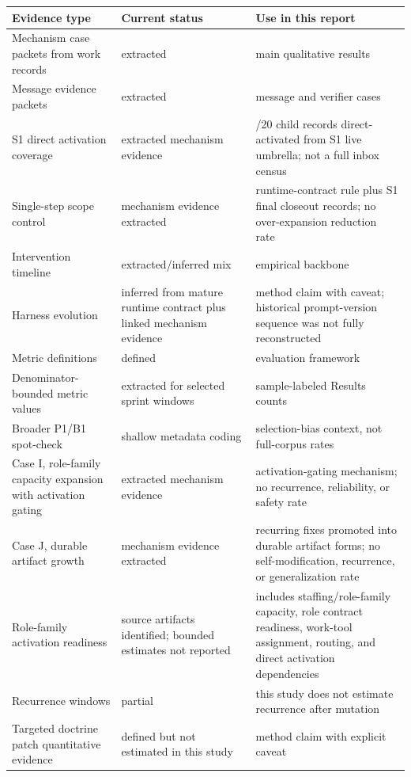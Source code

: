 \documentclass[
]{article}
\newcounter{none} %
\begin{document}
{\def\LTcaptype{none} %
\begin{longtable}[]{@{}
  >{\raggedright\arraybackslash}p{}
  >{\raggedright\arraybackslash}p{}
  >{\raggedright\arraybackslash}p{}@{}}
\toprule\noalign{}
\begin{minipage}[b]{\linewidth}\raggedright
Evidence type
\end{minipage} & \begin{minipage}[b]{\linewidth}\raggedright
Current status
\end{minipage} & \begin{minipage}[b]{\linewidth}\raggedright
Use in this report
\end{minipage} \\
\midrule\noalign{}
\endhead
\bottomrule\noalign{}
\endlastfoot
Mechanism case packets from work records & extracted & main qualitative results \\
Message evidence packets & extracted & message and verifier cases \\
S1 direct activation coverage & extracted mechanism evidence & 20/20 child records direct-activated from S1 live umbrella; not a full inbox census \\
Single-step scope control & mechanism evidence extracted & runtime-contract rule plus S1 final closeout records; no over-expansion reduction rate \\
Intervention timeline & extracted/inferred mix & empirical backbone \\
Harness evolution & inferred from mature runtime contract plus linked mechanism evidence & method claim with caveat; historical prompt-version sequence was not fully reconstructed \\
Metric definitions & defined & evaluation framework \\
Denominator-bounded metric values & extracted for selected sprint windows & sample-labeled Results counts \\
Broader P1/B1 spot-check & shallow metadata coding & selection-bias context, not full-corpus rates \\
Case I, role-family capacity expansion with activation gating & extracted mechanism evidence & activation-gating mechanism; no recurrence, reliability, or safety rate \\
Case J, durable artifact growth & mechanism evidence extracted & recurring fixes promoted into durable artifact forms; no self-modification, recurrence, or generalization rate \\
Role-family activation readiness & source artifacts identified; bounded estimates not reported & includes staffing/role-family capacity, role contract readiness, work-tool assignment, routing, and direct activation dependencies \\
Recurrence windows & partial & this study does not estimate recurrence after mutation \\
Targeted doctrine patch quantitative evidence & defined but not estimated in this study & method claim with explicit caveat \\
\end{longtable}
}
\end{document}

